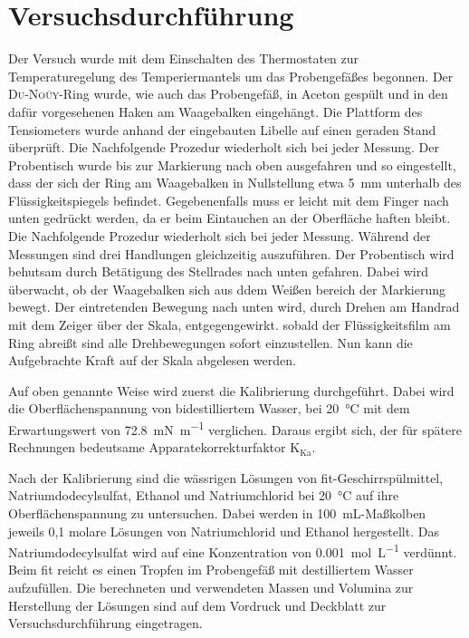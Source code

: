 \section{Versuchsdurchführung}
\label{sec:durchfuerung}

Der Versuch wurde mit dem Einschalten des Thermostaten zur Temperaturegelung des Temperiermantels um das Probengefäßes begonnen. Der \textsc{Du-Noüy}-Ring wurde, wie auch das Probengefäß, in Aceton gespült und in den dafür vorgesehenen Haken am Waagebalken eingehängt. Die Plattform des Tensiometers wurde anhand der eingebauten Libelle auf einen geraden Stand überprüft.  Die Nachfolgende Prozedur wiederholt sich bei jeder Messung. 
Der Probentisch wurde bis zur Markierung nach oben ausgefahren und so eingestellt, dass der sich der Ring am Waagebalken in Nullstellung  etwa \SI{5}{\milli\meter} unterhalb des Flüssigkeitspiegels befindet. Gegebenenfalls muss er leicht mit dem Finger nach unten gedrückt werden, da er beim Eintauchen an der Oberfläche haften bleibt. Die Nachfolgende Prozedur wiederholt sich bei jeder Messung. Während der Messungen sind drei Handlungen gleichzeitig auszuführen. Der Probentisch wird behutsam durch Betätigung des Stellrades nach unten gefahren. Dabei wird überwacht, ob der Waagebalken sich aus ddem Weißen bereich der Markierung bewegt. Der eintretenden Bewegung nach unten wird, durch Drehen am Handrad mit dem Zeiger über der Skala, entgegengewirkt. sobald der Flüssigkeitsfilm am Ring abreißt sind alle Drehbewegungen sofort einzustellen. Nun kann die Aufgebrachte Kraft auf der Skala abgelesen werden.

Auf oben genannte Weise wird zuerst die Kalibrierung durchgeführt. Dabei wird die Oberflächenspannung von bidestilliertem Wasser, bei \SI{20}{\degreeCelsius} mit dem Erwartungswert von \SI{72,8}{\milli\newton\per\meter} verglichen. Daraus ergibt sich, der für spätere Rechnungen bedeutsame Apparatekorrekturfaktor K$_{\text{Ka}}$.

Nach der Kalibrierung sind die wässrigen Lösungen von fit-Geschirrspülmittel, Natriumdodecylsulfat, Ethanol und Natriumchlorid bei \SI{20}{\degreeCelsius} auf ihre Oberflächenspannung zu untersuchen. Dabei werden in \SI{100}{\milli\liter}-Maßkolben jeweils 0,1 molare Lösungen von Natriumchlorid und Ethanol hergestellt. Das Natriumdodecylsulfat wird auf eine Konzentration von \SI{0,001}{\mole\per\liter} verdünnt. Beim fit reicht es einen Tropfen im Probengefäß mit destilliertem Wasser aufzufüllen. Die berechneten und verwendeten Massen und Volumina zur Herstellung der Lösungen sind auf dem Vordruck und Deckblatt zur Versuchsdurchführung eingetragen. 

